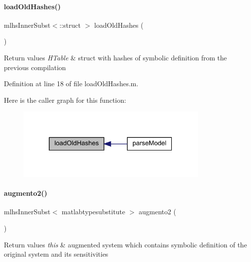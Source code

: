 \paragraph{\texorpdfstring{load\+Old\+Hashes()}{loadOldHashes()}}
{\footnotesize\ttfamily mlhs\+Inner\+Subst$<$\+::struct $>$ load\+Old\+Hashes (\begin{DoxyParamCaption}{ }\end{DoxyParamCaption})}


\begin{DoxyRetVals}{Return values}
{\em H\+Table} & struct with hashes of symbolic definition from the previous compilation \\
\hline
\end{DoxyRetVals}


Definition at line 18 of file load\+Old\+Hashes.\+m.

Here is the caller graph for this function\+:
\nopagebreak
\begin{figure}[H]
\begin{center}
\leavevmode
\includegraphics[width=269pt]{classamimodel_a93346c96338624e417ee9732ffd96b28_icgraph}
\end{center}
\end{figure}
\mbox{\label{classamimodel_abddb278082c1ff018f3b0ef121bba51a}} 
\paragraph{\texorpdfstring{augmento2()}{augmento2()}}
{\footnotesize\ttfamily mlhs\+Inner\+Subst$<$ matlabtypesubstitute $>$ augmento2 (\begin{DoxyParamCaption}{ }\end{DoxyParamCaption})}


\begin{DoxyRetVals}{Return values}
{\em this} & augmented system which contains symbolic definition of the original system and its sensitivities \\
\hline
\end{DoxyRetVals}


